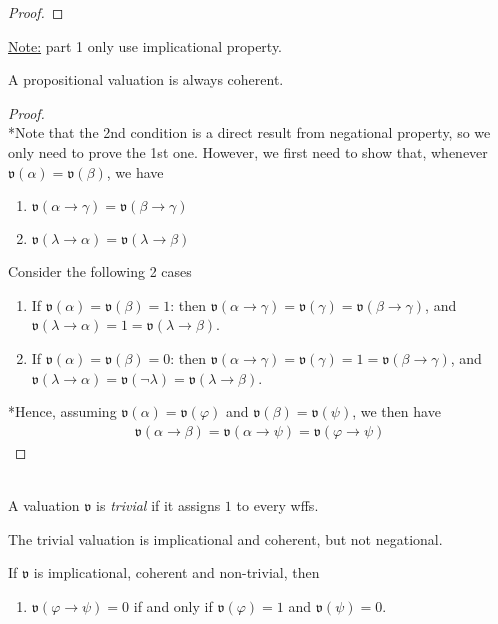 \documentclass{treatise}
\begin{document}
\begin{shaded}
\begin{proof}
\end{proof}
\underline{Note:} part 1 only use implicational property.
\begin{theorem}
A propositional valuation is always coherent.
\end{theorem}
\begin{proof} \ \\
*Note that the 2nd condition is a direct result from negational property, so we only need to prove the 1st one. However, we first need to show that, whenever $\mathfrak{v}(\alpha) = \mathfrak{v}(\beta)$, we have
\begin{enumerate}
    \item $\mathfrak{v}(\alpha \to \gamma) = \mathfrak{v}(\beta \to \gamma)$
    \item $\mathfrak{v}(\lambda \to \alpha) = \mathfrak{v}(\lambda \to \beta)$
\end{enumerate}
Consider the following 2 cases
\begin{enumerate}
    \item If $\mathfrak{v}(\alpha) = \mathfrak{v}(\beta) = 1$: then $\mathfrak{v}(\alpha \to \gamma) = \mathfrak{v}(\gamma) = \mathfrak{v}(\beta \to \gamma)$, and $\mathfrak{v}(\lambda \to \alpha) = 1 = \mathfrak{v}(\lambda \to \beta)$.
    \item If $\mathfrak{v}(\alpha) = \mathfrak{v}(\beta) = 0$: then $\mathfrak{v}(\alpha \to \gamma) = \mathfrak{v}(\gamma) = 1 = \mathfrak{v}(\beta \to \gamma)$, and $\mathfrak{v}(\lambda \to \alpha) = \mathfrak{v}(\neg \lambda) = \mathfrak{v}(\lambda \to \beta)$.
\end{enumerate}
*Hence, assuming $\mathfrak{v}(\alpha) = \mathfrak{v}(\varphi)$ and $\mathfrak{v}(\beta) = \mathfrak{v}(\psi)$, we then have
\begin{align*}
    \mathfrak{v}(\alpha \to \beta) = \mathfrak{v}(\alpha \to \psi) = \mathfrak{v}(\varphi \to \psi)
\end{align*}
\end{proof}
\ \\
A valuation $\mathfrak{v}$ is \emph{trivial} if it assigns $1$ to every wffs.
\begin{remark}
The trivial valuation is implicational and coherent, but not negational.
\end{remark}
\begin{theorem} \label{meta-sufficient-interpretation}
If $\mathfrak{v}$ is implicational, coherent and non-trivial, then
\begin{enumerate}
    \item $\mathfrak{v}(\varphi \to \psi) = 0$ if and only if $\mathfrak{v}(\varphi) = 1$ and $\mathfrak{v}(\psi) = 0$.

\end{enumerate}
\end{theorem}
\end{shaded}
\end{document}

